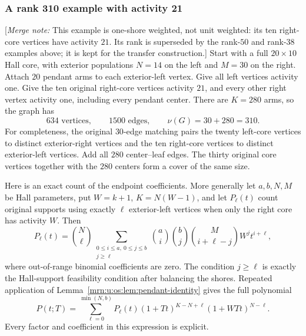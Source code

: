 \documentclass[11pt,a4paper]{article}
\theoremstyle{remark}\newtheorem{remark}[theorem]{Remark}
\newcommand{\mnote}[1]{[\textit{Merge note:} #1]}
\begin{document}
\subsubsection{A rank 310 example with activity 21}
\mnote{This example is one-shore weighted, not unit weighted: its ten right-core vertices have activity $21$. Its rank is superseded by the rank-$50$ and rank-$38$ examples above; it is kept for the transfer construction.}
Start with a full $20\times10$ Hall core, with exterior populations
$N=14$ on the left and $M=30$ on the right. Attach $20$ pendant arms to
each exterior-left vertex. Give all left vertices activity one. Give the
ten original right-core vertices activity $21$, and every other right
vertex activity one, including every pendant center.
There are $K=280$ arms, so the graph has
\[
 634\text{ vertices},\qquad1500\text{ edges},\qquad\nu(G)=30+280=310.
\]
For completeness, the original $30$-edge matching pairs the twenty
left-core vertices to distinct exterior-right vertices and the ten
right-core vertices to distinct exterior-left vertices. Add all $280$
center--leaf edges. The thirty original core vertices together with the
$280$ centers form a cover of the same size.

Here is an exact count of the endpoint coefficients. More generally let
$a,b,N,M$ be Hall parameters, put $W=k+1$, $K=N(W-1)$, and let $P_\ell(t)$
count original supports using exactly $\ell$ exterior-left vertices when
only the right core has activity $W$. Then
\begin{equation}\label{mrn:u:os:eq:marked-hall}
 P_\ell(t)=\binom N\ell
 \sum_{\substack{0\le i\le a,\ 0\le j\le b\\j\ge\ell}}
 \binom ai\binom bj\binom M{i+\ell-j}W^j t^{i+\ell},
\end{equation}
where out-of-range binomial coefficients are zero. The condition
$j\ge\ell$ is exactly the Hall-support feasibility condition after
balancing the shores. Repeated application of
Lemma~\ref{mrn:u:os:lem:pendant-identity} gives the full polynomial
\begin{equation}\label{mrn:u:os:eq:full-gadget-polynomial}
 P(t;T)=\sum_{\ell=0}^{\min(N,b)}P_\ell(t)
 (1+Tt)^{K-N+\ell}(1+WTt)^{N-\ell}.
\end{equation}
Every factor and coefficient in this expression is explicit.
\end{document}
